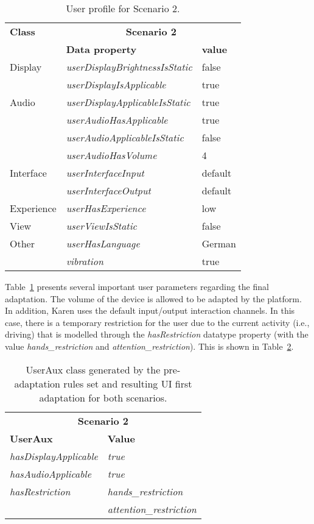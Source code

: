 \begin{table}
 \caption{User profile for Scenario 2.}
 \label{tbl:user_profile_scenario2}
 \footnotesize
 \centering
\begin{tabular}{l l l}
  \hline 
  \textbf{Class} & \multicolumn{2}{c}{\textbf{Scenario 2}}		\\
	  & \textbf{Data property} 		   & \textbf{value}	\\
  \hline
  Display & \textit{userDisplayBrightnessIsStatic} & false		\\
	  & \textit{userDisplayIsApplicable} 	   & true		\\
  Audio   & \textit{userDisplayApplicableIsStatic}& true		\\
	  & \textit{userAudioHasApplicable} 	   & true		\\
	  & \textit{userAudioApplicableIsStatic}   & false		\\
	  & \textit{userAudioHasVolume}  	   & 4 		\\
 Interface& \textit{userInterfaceInput}		   & default		\\
	  & \textit{userInterfaceOutput} 	   & default		\\
Experience& \textit{userHasExperience} 		   & low		\\
  View	  & \textit{userViewIsStatic}		   & false		\\
  Other   & \textit{userHasLanguage}		   & German		\\
	  & \textit{vibration} 			   & true 		\\
  \hline
\end{tabular}
\end{table}

Table~\ref{tbl:user_profile_scenario2} presents several important user 
parameters regarding the final adaptation. The volume of the device is allowed
to be adapted by the platform. In addition, Karen uses the default 
input/output interaction channels. In this case, there is a temporary 
restriction for the user due to the current activity (i.e., driving) that is 
modelled through the \textit{hasRestriction} datatype property (with the value 
\textit{hands\_restriction} and \textit{attention\_restriction}). This is shown
in Table~\ref{tbl:userAux_scenario2}.

\begin{table}
 \caption{UserAux class generated by the pre-adaptation rules set and resulting
 UI first adaptation for both scenarios.}
 \label{tbl:userAux_scenario2}
 \footnotesize
 \centering
\begin{tabular}{l l}
  \hline 
  \multicolumn{2}{c}{\textbf{Scenario 2}}			\\
  \textbf{UserAux} 		& \textbf{Value} 		\\
  \hline
  \textit{hasDisplayApplicable}	& \textit{true}			\\
  \textit{hasAudioApplicable}	& \textit{true} 		\\
  \textit{hasRestriction}	& \textit{hands\_restriction}	\\
  ~				& \textit{attention\_restriction}\\
  \hline
\end{tabular}
\end{table}

